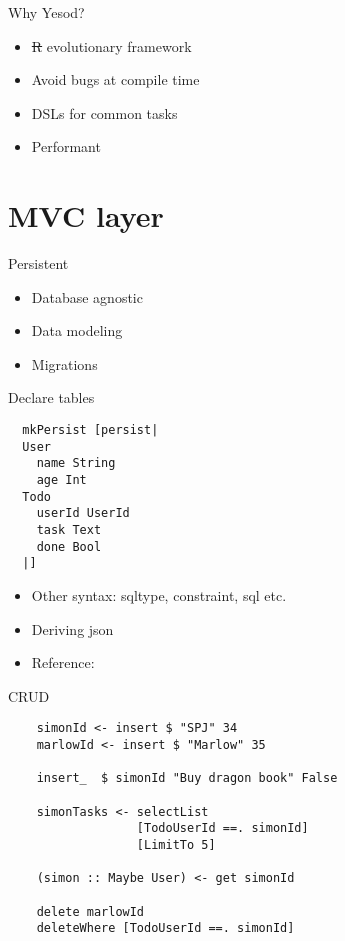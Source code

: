 \documentclass{beamer}
\begin{document}
\begin{frame}{Why Yesod?}
  \begin{itemize}
  \item \st{R} evolutionary framework
  \item Avoid bugs at compile time
  \item DSLs for common tasks
  \item Performant
  \end{itemize}
\end{frame}

\section{MVC layer}

\begin{frame}{Persistent}

  \begin{itemize}
  \item Database agnostic
  \item Data modeling
  \item Migrations
  \end{itemize}
\end{frame}

\begin{frame}[fragile]{Declare tables}
\begin{lstlisting}
  mkPersist [persist|
  User
    name String
    age Int
  Todo
    userId UserId  
    task Text
    done Bool
  |]
\end{lstlisting}
\begin{itemize}
\item Other syntax: sqltype, constraint, sql etc.
\item Deriving json
\item Reference: \href{https://github.com/yesodweb/persistent/blob/master/docs/Persistent-entity-syntax.md}{}
\end{itemize}

\end{frame}

\begin{frame}[fragile]{CRUD}
  \begin{lstlisting}
    simonId <- insert $ "SPJ" 34
    marlowId <- insert $ "Marlow" 35

    insert_  $ simonId "Buy dragon book" False

    simonTasks <- selectList
                  [TodoUserId ==. simonId]
                  [LimitTo 5]

    (simon :: Maybe User) <- get simonId

    delete marlowId
    deleteWhere [TodoUserId ==. simonId]
  \end{lstlisting}
\end{frame}
\end{document}
